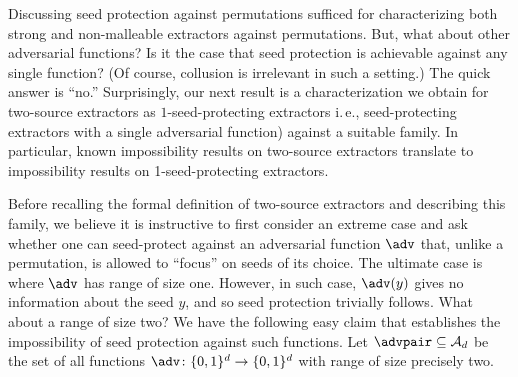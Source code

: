 \documentclass[11pt]{article}
\numberwithin{equation}{section}
\theoremstyle{definition}
\theoremstyle{plain}
\newcommand{\ie}{i.\,e.}
\begin{document}
Discussing seed protection against permutations sufficed for characterizing both strong and non-malleable extractors against permutations. 
But, what about other adversarial functions? Is it the case that seed protection is achievable against any single function?
%
(Of course, collusion is irrelevant in such a setting.) %
The quick answer is %
``no.''   %
Surprisingly, our next result is a characterization we obtain for two-source extractors as $1$-seed-protecting extractors %
\ie,  %
seed-protecting extractors with a single adversarial function) against a suitable family. In particular, known impossibility results on two-source extractors translate to impossibility results on 1-seed-protecting extractors. %

%

Before recalling the formal definition of two-source extractors and describing this family, we believe it is instructive to first consider an extreme case and ask whether one can seed-protect against an adversarial function $\adv$ that, unlike a permutation, is allowed to ``focus'' on seeds of its choice.  The ultimate case is where $\adv$ has range of size one.  %
%
%
However, in such case, $\adv(y)$ gives no information about the seed $y$, and so seed %
protection  %
trivially follows. What about
a  %
range of size two? We have the following easy claim that establishes
the  %
%
impossibility of seed protection against such functions. Let $\advpair \subseteq \mathcal{A}_d$ be the set of all functions $\adv \colon \{0,1\}^d \to \{0,1\}^d$ with range of size precisely two.
%
\end{document}

